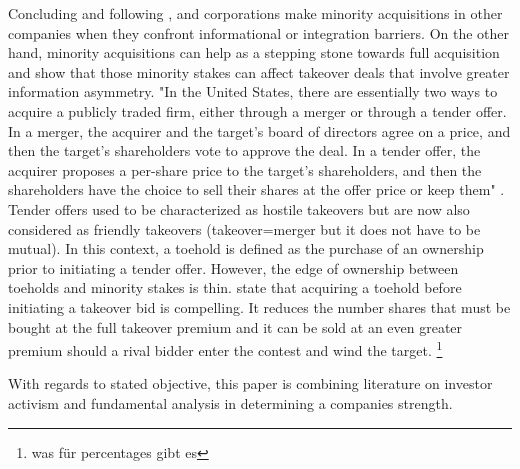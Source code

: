 \documentclass[12pt]{article}
\begin{document}
Concluding and following \citet{Allen2000},\citet{Ouimet2013} and \citet{Huang2017} corporations make minority acquisitions in other companies when they confront informational or integration barriers. On the other hand, minority acquisitions can help as a stepping stone towards full acquisition and \citet{Huang2017} show that those minority stakes can affect takeover deals that involve greater information asymmetry. "In the United States, there are essentially two ways to acquire a publicly traded firm, either through a merger or through a tender offer. In a merger, the acquirer and the target’s board of directors agree on a price, and then the target’s shareholders vote to approve the deal. In a tender offer, the acquirer proposes a per-share price to the target’s shareholders, and then the shareholders have the choice to sell their shares at the offer price or keep them" \citep[p. 2]{Offenberg2015}. Tender offers used to be characterized as hostile takeovers but are now also considered as friendly takeovers (takeover=merger but it does not have to be mutual). In this context, a toehold is defined as the purchase of an ownership prior to initiating a tender offer. However, the edge of ownership between toeholds and minority stakes is thin. \citet{Eckbo2009} state that acquiring a toehold before initiating a takeover bid is compelling. It reduces the number shares that must be bought at the full takeover premium and it can be sold at an even greater premium should a rival bidder enter the contest and wind the target. 
	\footnote{was für percentages gibt es}










\pagebreak
With regards to stated objective, this paper is combining literature on investor activism and fundamental analysis in determining a companies strength.
\end{document}
